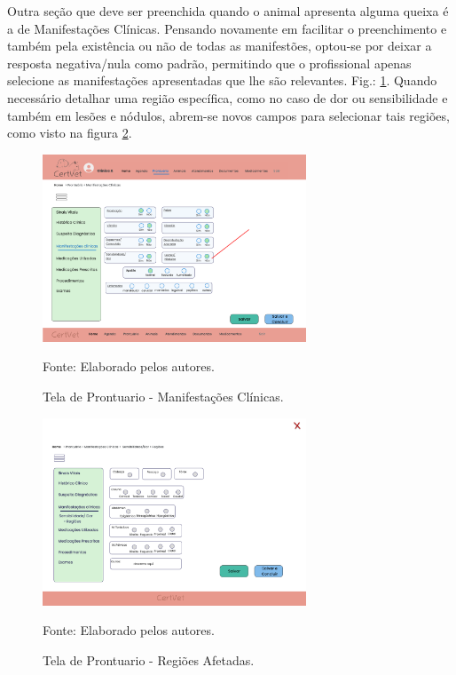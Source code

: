 \documentclass[
    12pt,               %
    openright,          %
    oneside,
    a4paper,            %
    BIBLATEX,           %
    TODO,               %
    english,            %
    brazil              %
    ]{ifsp-spo-inf-ctds}
\begin{document}
Outra seção que deve ser preenchida quando o animal apresenta alguma queixa é a de Manifestações Clínicas. Pensando novamente em facilitar o preenchimento e também pela existência ou não de todas as manifestões, optou-se por deixar a resposta negativa/nula como padrão, permitindo que o profissional apenas selecione as manifestações apresentadas que lhe são relevantes. Fig.: \ref{fig:Manifestacoes}. Quando necessário detalhar uma região específica, como no caso de dor ou sensibilidade e também em lesões e nódulos, abrem-se novos campos para selecionar tais regiões, como visto na figura \ref{fig:Regioes}. 

   \begin{figure}[H]
                \centering
                \caption{Tela de Prontuario - Manifestações Clínicas.}
                \includegraphics[width=0.7\textwidth]{images/Telas/Manifestacoes clinicas.png}
                
                \label{fig:Manifestacoes}
                \centering
        {\footnotesize Fonte: Elaborado pelos autores.}
            \end{figure}    

            \begin{figure}[H]
                \centering
                \caption{Tela de Prontuario - Regiões Afetadas.}
                \includegraphics[width=0.7\textwidth]{images/Telas/Regioes.png}
                
                \label{fig:Regioes}
                \centering
        {\footnotesize Fonte: Elaborado pelos autores.}
            \end{figure}    
\end{document}
